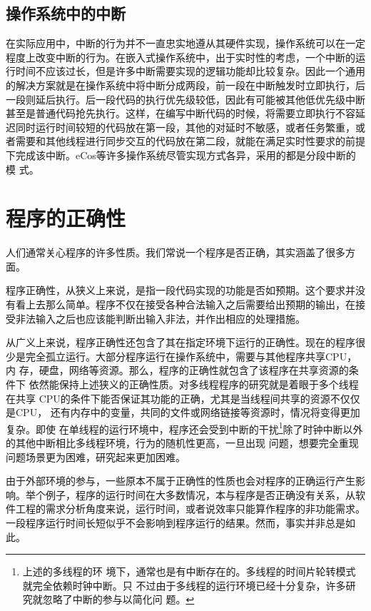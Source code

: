 \subsection{操作系统中的中断}
\label{subsec:intr_OS}
在实际应用中，中断的行为并不一直忠实地遵从其硬件实现，操作系统可以在一定
程度上改变中断的行为。在嵌入式操作系统中，出于实时性的考虑，一个中断的运
行时间不应该过长，但是许多中断需要实现的逻辑功能却比较复杂。因此一个通用
的解决方案就是在操作系统中将中断分成两段，前一段在中断触发时立即执行，后
一段则延后执行。后一段代码的执行优先级较低，因此有可能被其他低优先级中断
甚至是普通代码抢先执行。这样，在编写中断代码的时候，将需要立即执行不容延
迟同时运行时间较短的代码放在第一段，其他的对延时不敏感，或者任务繁重，或
者需要和其他线程进行同步交互的代码放在第二段，就能在满足实时性要求的前提
下完成该中断。eCos等许多操作系统尽管实现方式各异，采用的都是分段中断的模
式。\cite{ecos}


\section{程序的正确性}
\label{sec:correctness}
人们通常关心程序的许多性质。我们常说一个程序是否正确，其实涵盖了很多方面。

程序正确性，从狭义上来说，是指一段代码实现的功能是否如预期。这个要求并没
有看上去那么简单。程序不仅在接受各种合法输入之后需要给出预期的输出，在接
受非法输入之后也应该能判断出输入非法，并作出相应的处理措施。

从广义上来说，程序正确性还包含了其在指定环境下运行的正确性。现在的程序很
少是完全孤立运行。大部分程序运行在操作系统中，需要与其他程序共享CPU，内
存，硬盘，网络等资源。那么，程序的正确性就包含了该程序在共享资源的条件下
依然能保持上述狭义的正确性质。对多线程程序的研究就是着眼于多个线程在共享
CPU的条件下能否保证其功能的正确，尤其是当线程间共享的资源不仅仅是CPU，
还有内存中的变量，共同的文件或网络链接等资源时，情况将变得更加复杂。即使
在单线程的运行环境中，程序还会受到中断的干扰\footnote{上述的多线程的环
境下，通常也是有中断存在的。多线程的时间片轮转模式就完全依赖时钟中断。只
不过由于多线程的运行环境已经十分复杂，许多研究就忽略了中断的参与以简化问
题。}除了时钟中断以外的其他中断相比多线程环境，行为的随机性更高，一旦出现
问题，想要完全重现问题场景更为困难，研究起来更加困难。

由于外部环境的参与，一些原本不属于正确性的性质也会对程序的正确运行产生影
响。举个例子，程序的运行时间在大多数情况，本与程序是否正确没有关系，从软
件工程的需求分析角度来说，运行时间，或者说效率只能算作程序的非功能需求。
一段程序运行时间长短似乎不会影响到程序运行的结果。然而，事实并非总是如此。

